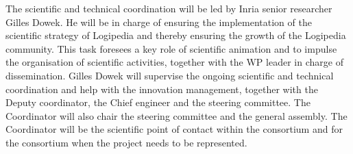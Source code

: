 \begin{workpackage}[id=management,type=MGT,wphases=1-48,
  short=Management,
  title=Management,
  lead=Inr,InrRM=36,BirRM=1,InnRM=1,SacRM=1,TumRM=1,IrtRM=1,LeeRM=1]
\begin{tasklist}
  \begin{task}[id=coordination,title=Scientific and technical coordination,lead=Inr,InrRM=12,wphases=1-48]
    The scientific and technical coordination will be led by Inria
    senior researcher Gilles Dowek. He will be in charge of ensuring
    the implementation of the scientific strategy of Logipedia and
    thereby ensuring the growth of the Logipedia community. This task
    foresees a key role of scientific animation and to impulse the
    organisation of scientific activities, together with the WP leader
    in charge of dissemination. Gilles Dowek will supervise the
    ongoing scientific and technical coordination and help with the
    innovation management, together with the Deputy coordinator, the
    Chief engineer and the steering committee. The
    Coordinator will also chair the steering committee and the general
    assembly. The Coordinator will be the scientific point of contact
    within the consortium and for the consortium when the project
    needs to be represented.
  \end{task}


\end{tasklist}
\end{workpackage}
